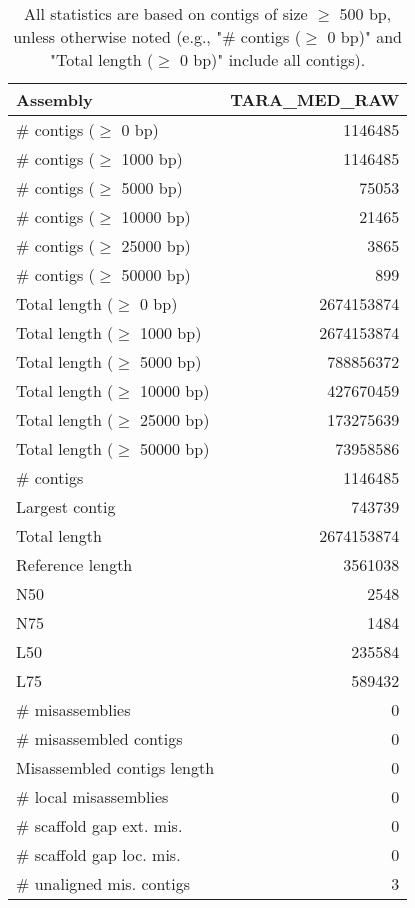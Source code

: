 \documentclass[12pt,a4paper]{article}
\begin{document}
\begin{table}[ht]
\begin{center}
\caption{All statistics are based on contigs of size $\geq$ 500 bp, unless otherwise noted (e.g., "\# contigs ($\geq$ 0 bp)" and "Total length ($\geq$ 0 bp)" include all contigs).}
\begin{tabular}{|l*{1}{|r}|}
\hline
Assembly & TARA\_MED\_RAW \\ \hline
\# contigs ($\geq$ 0 bp) & 1146485 \\ \hline
\# contigs ($\geq$ 1000 bp) & 1146485 \\ \hline
\# contigs ($\geq$ 5000 bp) & 75053 \\ \hline
\# contigs ($\geq$ 10000 bp) & 21465 \\ \hline
\# contigs ($\geq$ 25000 bp) & 3865 \\ \hline
\# contigs ($\geq$ 50000 bp) & 899 \\ \hline
Total length ($\geq$ 0 bp) & 2674153874 \\ \hline
Total length ($\geq$ 1000 bp) & 2674153874 \\ \hline
Total length ($\geq$ 5000 bp) & 788856372 \\ \hline
Total length ($\geq$ 10000 bp) & 427670459 \\ \hline
Total length ($\geq$ 25000 bp) & 173275639 \\ \hline
Total length ($\geq$ 50000 bp) & 73958586 \\ \hline
\# contigs & 1146485 \\ \hline
Largest contig & 743739 \\ \hline
Total length & 2674153874 \\ \hline
Reference length & 3561038 \\ \hline
N50 & 2548 \\ \hline
N75 & 1484 \\ \hline
L50 & 235584 \\ \hline
L75 & 589432 \\ \hline
\# misassemblies & 0 \\ \hline
\# misassembled contigs & 0 \\ \hline
Misassembled contigs length & 0 \\ \hline
\# local misassemblies & 0 \\ \hline
\# scaffold gap ext. mis. & 0 \\ \hline
\# scaffold gap loc. mis. & 0 \\ \hline
\# unaligned mis. contigs & 3 \\ \hline

\end{tabular}
\end{center}
\end{table}
\end{document}
